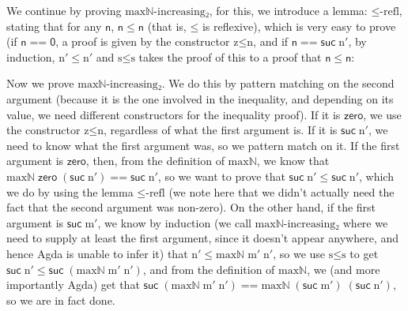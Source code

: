 \documentclass{article}
\newcommand{\Conid}[1]{\mathit{#1}}
\newcommand{\Varid}[1]{\mathit{#1}}
\def\resethooks{%
  \global\let\SaveRestoreHook\empty
  \global\let\ColumnHook\empty}
\let\hspre\empty
\let\hspost\empty
\renewcommand\Varid[1]{\mathord{\textsf{#1}}}
\let\Conid\Varid
\begin{document}
We continue by proving \ensuremath{\Varid{maxℕ-increasing₂}}, for this, we introduce a lemma: \ensuremath{\Varid{≤-refl}}, stating that for any \ensuremath{\Varid{n}}, \ensuremath{\Varid{n}\;\Varid{≤}\;\Varid{n}} (that is, \ensuremath{\Varid{≤}} is reflexive), which is very easy to prove (if \ensuremath{\Varid{n}\;\Varid{==}\;\Varid{0}}, a proof is given by the constructor \ensuremath{\Varid{z≤n}}, and if \ensuremath{\Varid{n}\;\Varid{==}\;\Varid{suc}\;\Varid{n′}}, by induction, \ensuremath{\Varid{n′}\;\Varid{≤}\;\Varid{n′}} and \ensuremath{\Varid{s≤s}} takes the proof of this to a proof that \ensuremath{\Varid{n}\;\Varid{≤}\;\Varid{n}}:
\resethooks
Now we prove \ensuremath{\Varid{maxℕ-increasing₂}}.
We do this by pattern matching on the second argument (because it is the one involved in the inequality, and depending on its value, we need different constructors for the inequality proof). If it is \ensuremath{\Varid{zero}}, we use the constructor \ensuremath{\Varid{z≤n}}, regardless of what the first argument is. If it is \ensuremath{\Varid{suc}\;\Varid{n′}}, we need to know what the first argument was, so we pattern match on it. If the first argument is \ensuremath{\Varid{zero}}, then, from the definition of \ensuremath{\Varid{maxℕ}}, we know that \ensuremath{\Varid{maxℕ}\;\Varid{zero}\;(\Varid{suc}\;\Varid{n′})\;\Varid{==}\;\Varid{suc}\;\Varid{n′}}, so we want to prove that \ensuremath{\Varid{suc}\;\Varid{n′}\;\Varid{≤}\;\Varid{suc}\;\Varid{n′}}, which we do by using the lemma \ensuremath{\Varid{≤-refl}} (we note here that we didn't actually need the fact that the second argument was non-zero). On the other hand, if the first argument is \ensuremath{\Varid{suc}\;\Varid{m′}}, we know by induction (we call \ensuremath{\Varid{maxℕ-increasing₂}} where we need to supply at least the first argument, since it doesn't appear anywhere, and hence Agda is unable to infer it) that \ensuremath{\Varid{n′}\;\Varid{≤}\;\Varid{maxℕ}\;\Varid{m′}\;\Varid{n′}}, so we use \ensuremath{\Varid{s≤s}} to get \ensuremath{\Varid{suc}\;\Varid{n′}\;\Varid{≤}\;\Varid{suc}\;(\Varid{maxℕ}\;\Varid{m′}\;\Varid{n′})}, and from the definition of \ensuremath{\Varid{maxℕ}}, we (and more importantly Agda) get that \ensuremath{\Varid{suc}\;(\Varid{maxℕ}\;\Varid{m′}\;\Varid{n′})\;\Varid{==}\;\Varid{maxℕ}\;(\Varid{suc}\;\Varid{m′})\;(\Varid{suc}\;\Varid{n′})}, so we are in fact done.
\end{document}

